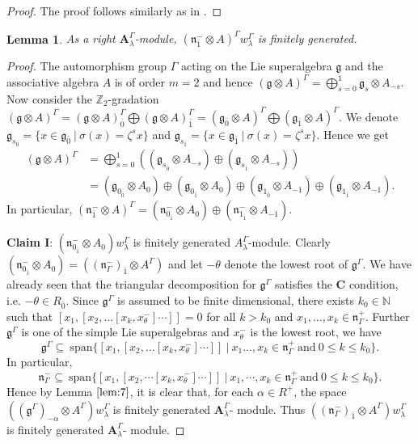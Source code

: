 \documentclass[11pt]{amsart}
\theoremstyle{plain}
\newtheorem{lemma}[thm]{Lemma}
\theoremstyle{definition}
\newcommand{\g}{\mathfrak{g}}
\newcommand{\n}{\mathfrak{n}}
\newcommand{\A}{\mathbf{A}_{\lambda}^{\Gamma}}
\begin{document}
\begin{proof}
 The proof follows similarly as in \cite[Lemma 7.4]{BCM19}.
\end{proof}

\begin{lemma}{\label{lem:9}}
As a right $\A$-module, $(\n_{\bar{1}}^{-}\otimes A)^{\Gamma}w_{\lambda}^{\Gamma}$ is finitely generated.
\end{lemma}
\begin{proof}
The automorphism group $\Gamma$ acting on the Lie superalgebra $\g$ and the associative algebra $A$ is of order $m=2$ and hence $(\g\otimes A)^{\Gamma}=\bigoplus_{s=0}^{1}\g_{s}\otimes A_{-s}$. Now consider the $\mathbb{Z}_{2}$-gradation $(\g\otimes A)^{\Gamma}=(\g\otimes A)^{\Gamma}_{\bar{0}}\bigoplus(\g\otimes A)^{\Gamma}_{\bar{1}}=(\g_{\bar{0}}\otimes A)^{\Gamma}\bigoplus(\g_{\bar{1}}\otimes A)^{\Gamma}$. We denote $\g_{s_{\bar{0}}}=\{x\in\g_{\bar{0}}~|~\sigma(x)=\zeta^{s}x\}$ and $\g_{s_{\bar{1}}}=\{x\in\g_{\bar{1}}~|~\sigma(x)=\zeta^{s}x\}$. Hence we get
    \begin{align*}
        (\g\otimes A)^{\Gamma} &=\bigoplus_{s=0}^{1}((\g_{s_{\bar{0}}}\otimes A_{-s})\oplus(\g_{s_{\bar{1}}}\otimes A_{-s}))\\
            &=(\g_{0_{\bar{0}}}\otimes A_{0})\oplus(\g_{0_{\bar{1}}}\otimes A_{0})\oplus(\g_{1_{\bar{0}}}\otimes A_{-1})\oplus(\g_{1_{\bar{1}}}\otimes A_{-1}).
    \end{align*}
In particular, $(\n^{-}_{\bar{1}}\otimes A)^{\Gamma}=(\n^{-}_{0_{\bar{1}}}\otimes A_{0})\oplus(\n^{-}_{1_{\bar{1}}}\otimes A_{-1})$.

{\bf Claim I}: $(\n^{-}_{0_{\bar{1}}}\otimes A_{0})w_{\lambda}^{\Gamma}$ is finitely generated $A_{\lambda}^{\Gamma}$-module. Clearly $(\n^{-}_{0_{\bar{1}}}\otimes A_{0})=((\n^{-}_{\Gamma})_{\bar{1}}\otimes A^{\Gamma})$ and let $-\theta$ denote the lowest root of $\g^{\Gamma}$. We have already seen that the  triangular decomposition for $\g^{\Gamma}$ satisfies the $\mathbf{C}$ condition, i.e. $-\theta \in R_{\bar{0}}$. Since $\g^{\Gamma}$ is assumed to be finite dimensional, there exists $k_{0}\in\mathbb{N}$ such that $[x_{1},[x_{2},\ldots[x_{k},x_{\theta}^{-}]\cdots]]=0$ for all $k>k_{0}$ and $x_{1},\ldots,x_{k}\in\n^{+}_{\Gamma}$. Further $\g^{\Gamma}$ is one of the simple Lie superalgebras and $x_{\theta}^{-}$ is the lowest root, we have
\begin{equation*}
\g^{\Gamma}\subseteq~\mbox{span}\{[x_{1},[x_{2},\ldots[x_{k},x_{\theta}^{-}]\cdots]]~|~x_{1}\ldots,x_{k}\in\n^{+}_{\Gamma}~\mbox{and}~0\leq k\leq k_{0}\}.
\end{equation*}
In particular,
\begin{equation}\label{eq:4}
\n_{\Gamma}^{-}\subseteq~\mbox{span}\{[x_{1},[x_{2},\cdots[x_{k},x_{\theta}^{-}]\cdots]]~|~x_{1},\cdots,x_{k}\in\n^{+}_{\Gamma}~ \mbox{and}~0\leq k\leq k_{0}\}.
\end{equation}
Hence by Lemma $\ref{lem:7}$, it is clear that, for each $\alpha\in R^{+}$, the space $((\g^{\Gamma})_{-\alpha}\otimes A^{\Gamma})w_{\lambda}^{\Gamma}$ is finitely generated $\A$- module. Thus $((\n^{-}_{\Gamma})_{\bar{1}}\otimes A^{\Gamma})w_{\lambda}^{\Gamma}$ is finitely generated $\A$- module.
    

\end{proof}
\end{document}
